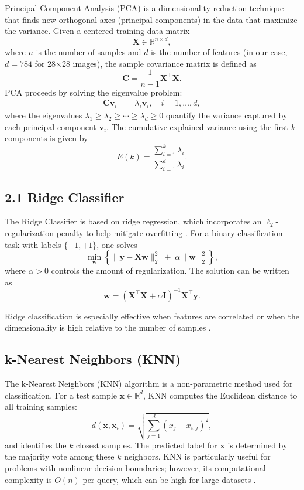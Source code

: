 \documentclass[11pt]{amsart}
\begin{document}
Principal Component Analysis (PCA) is a dimensionality reduction technique that finds new orthogonal axes (principal components) in the data that maximize the variance. Given a centered training data matrix 
\[
\mathbf{X} \in \mathbb{R}^{n \times d},
\]
where \(n\) is the number of samples and \(d\) is the number of features (in our case, \(d=784\) for 28×28 images), the sample covariance matrix is defined as
\[
\mathbf{C} = \frac{1}{n-1}\mathbf{X}^\top \mathbf{X}.
\]
PCA \cite{Jolliffe2016} proceeds by solving the eigenvalue problem:
\begin{align*}
\mathbf{C}\mathbf{v}_i &= \lambda_i \mathbf{v}_i, \quad i = 1,\dots,d,
\end{align*}
where the eigenvalues \(\lambda_1 \geq \lambda_2 \geq \cdots \geq \lambda_d \geq 0\) quantify the variance captured by each principal component \(\mathbf{v}_i\). The cumulative explained variance using the first \(k\) components is given by
\[
E(k) = \frac{\sum_{i=1}^{k}\lambda_i}{\sum_{i=1}^{d}\lambda_i}.
\]


\subsection*{2.1 Ridge Classifier}
The Ridge Classifier is based on ridge regression, which incorporates an \(\ell_2\)-regularization
penalty to help mitigate overfitting \cite{Hoerl1970}. For a binary classification task with
labels \(\{-1, +1\}\), one solves
\[
\min_{\mathbf{w}} \left\{ \|\mathbf{y} - \mathbf{X}\mathbf{w}\|_2^2 \;+\; \alpha \|\mathbf{w}\|_2^2 \right\},
\]
where \(\alpha > 0\) controls the amount of regularization. The solution can be written as
\[
\mathbf{w} = \left(\mathbf{X}^\top \mathbf{X} + \alpha \mathbf{I}\right)^{-1} \mathbf{X}^\top \mathbf{y}.
\]

Ridge classification is especially effective when features are correlated or when the dimensionality
is high relative to the number of samples \cite{Hoerl1970}.


\subsection{k-Nearest Neighbors (KNN)}
The k-Nearest Neighbors (KNN) algorithm is a non-parametric method used for classification. For a test sample \(\mathbf{x} \in \mathbb{R}^d\), KNN computes the Euclidean distance to all training samples:
\[
d(\mathbf{x}, \mathbf{x}_i) = \sqrt{\sum_{j=1}^{d} \left(x_j - x_{i,j}\right)^2},
\]
and identifies the \(k\) closest samples. The predicted label for \(\mathbf{x}\) is determined by the majority vote among these \(k\) neighbors. KNN is particularly useful for problems with nonlinear decision boundaries; however, its computational complexity is \(O(n)\) per query, which can be high for large datasets \cite{Cover1967}.
\end{document}
